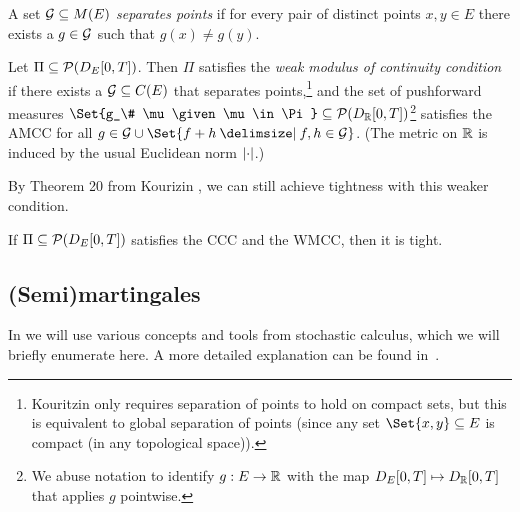 \begin{definition}\label{def:s.p.}
  A set \( \mathcal{G} \subseteq M(E) \) \textit{separates points} if for every pair of distinct points \( x, y \in E \) there exists a \( g \in \mathcal{G} \) such that \( g(x) \neq g(y) \).
\end{definition}

\begin{definition}[WMCC]\label{def:WMCC}
  Let \( \Pi \subseteq \mathcal{P}(D_{E}[0,T]) \).
  Then \( \Pi \) satisfies the \textit{weak modulus of continuity condition} if there exists a \( \mathcal{G} \subseteq C(E) \) that separates points,\footnote{Kouritzin only requires separation of points to hold on compact sets, but this is equivalent to global separation of points (since any set \( \Set{x,y} \subseteq E \) is compact (in any topological space)).}
  and the set of pushforward measures \( \Set{g_\# \mu \given \mu \in \Pi} \subseteq \cP(D_\bR[0,T]) \)\footnote{We abuse notation to identify \( g : E \to \mathbb{R} \) with the map \( D_E[0,T] \mapsto D_{\mathbb{R}}[0,T] \) that applies \( g \) pointwise.} satisfies the AMCC for all \( g \in \cG \cup \Set{f + h \given f, h \in \cG} \).
  (The metric on \( \mathbb{R} \) is induced by the usual Euclidean norm \( \lvert\cdot\rvert \).)
\end{definition}

By Theorem 20 from Kourizin \cite{kouritzinTightnessProbabilityMeasures2015}, we can still achieve tightness with this weaker condition.

\begin{theorem}\label{thm:ccc+wmcc=tight}
  If \( \Pi \subseteq \mathcal{P}(D_{E}[0,T]) \) satisfies the CCC and the WMCC, then it is tight.
\end{theorem}

\subsection{(Semi)martingales}

In  we will use various concepts and tools from stochastic calculus, which we will briefly enumerate here.
A more detailed explanation can be found in~\cite{klebanerIntroductionStochasticCalculus2012}.

